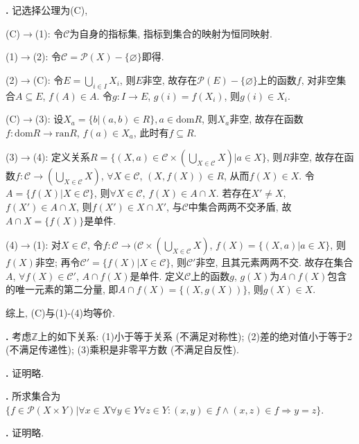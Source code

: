 \par \textbf{\thesolset .} 记选择公理为(C),
\par (C)$\to$(1): 令$\mathcal{C}$为自身的指标集, 指标到集合的映射为恒同映射. 
\par (1)$\to$(2): 令$\mathcal{C}=\mathcal{P}(X)-\{\varnothing\}$即得. 
\par (2)$\to$(C): 令$E=\bigcup_{i\in I} X_i$, 则$E$非空, 故存在$\mathcal{P}(E)-\{\varnothing\}$上的函数$f$, 对非空集合$A\subseteq E$, $f(A)\in A$. 令$g:I\to E$, $g(i)=f(X_i)$, 则$g(i)\in X_i$. 
\par (C)$\to$(3): 设$X_a=\{b\vert (a,b)\in R\}, a\in \text{dom}R$, 则$X_a$非空, 故存在函数$f: \text{dom}R\to \text{ran}R$, $f(a)\in X_a$, 此时有$f\subseteq R$. 
\par (3)$\to$(4): 定义关系$R=\{(X,a)\in \mathcal{C} \times \left(\bigcup_{X\in \mathcal{C}} X\right)\vert a\in X\}$, 则$R$非空, 故存在函数$f:\mathcal{C} \to \left(\bigcup_{X\in \mathcal{C}} X\right)$, $\forall X\in \mathcal{C}$, $(X,f(X))\in R$, 从而$f(X)\in X$. 令$A=\{f(X)\vert X\in \mathcal{C}\}$, 则$\forall X\in \mathcal{C}$, $f(X)\in A\cap X$. 若存在$X'\neq X$, $f(X')\in A\cap X$, 则$f(X')\in X\cap X'$, 与$\mathcal{C}$中集合两两不交矛盾, 故$A\cap X=\{f(X)\}$是单件. 
\par (4)$\to$(1): 对$X\in \mathcal{C}$, 令$f:\mathcal{C}\to (\mathcal{C}\times \left(\bigcup_{X\in \mathcal{C}} X\right)$, $f(X)=\{(X,a)\vert a\in X\}$, 则$f(X)$非空; 再令$\mathcal{C}'= \{f(X)\vert X\in \mathcal{C}\}$, 则$\mathcal{C}'$非空, 且其元素两两不交. 故存在集合$A$, $\forall f(X)\in \mathcal{C}'$, $A\cap f(X)$是单件. 定义$\mathcal{C}$上的函数$g$, $g(X)$为$A\cap f(X)$包含的唯一元素的第二分量, 即$A\cap f(X)=\{(X, g(X))\}$, 则$g(X)\in X$. 
\par 综上, (C)与(1)-(4)均等价.

\par \textbf{\thesolset .} 考虑$\mathbb{Z}$上的如下关系:
(1)小于等于关系 (不满足对称性);
(2)差的绝对值小于等于2 (不满足传递性);
(3)乘积是非零平方数 (不满足自反性).

\par \textbf{\thesolset .} 证明略. 

\par \textbf{\thesolset .} 所求集合为$\{f\in \mathcal{P}(X\times Y)\vert \forall x\in X\forall y\in Y\forall z\in Y: (x,y)\in f \land (x,z)\in f\Rightarrow y=z\}$. 

\par \textbf{\thesolset .} 证明略. 

